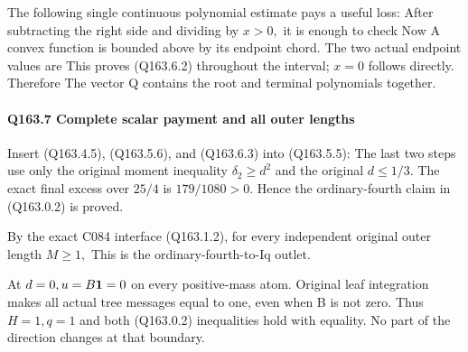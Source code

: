 The following single continuous polynomial estimate pays a useful loss:
After subtracting the right side and dividing by \(x>0,\allowbreak \) it is enough to
check
Now
A convex function is bounded above by its endpoint chord. The two actual
endpoint values are
This proves (Q163.6.2) throughout the interval; \(x=0\) follows directly.
Therefore
The vector Q contains the root and terminal polynomials together.

\paragraph{Q163.7 Complete scalar payment and all outer lengths}\label{part:Q163.7}

Insert (Q163.4.5), (Q163.5.6), and (Q163.6.3) into (Q163.5.5):
The last two steps use only the original moment inequality \(\delta_2\ge d^2\)
and the original \(d\le 1/3.\) The exact final excess over \(25/4\) is
\(179/1080>0.\) Hence the ordinary-fourth claim in (Q163.0.2) is proved.

By the exact C084 interface (Q163.1.2), for every independent original
outer length \(M\ge 1,\allowbreak \)
This is the ordinary-fourth-to-Iq outlet.

At \(d=0,\allowbreak  u=B\mathbf1=0\) on every positive-mass atom. Original leaf integration
makes all actual tree messages equal to one, even when B is not zero.
Thus \(H=1,\allowbreak  q=1\) and both (Q163.0.2) inequalities hold with equality.
No part of the direction changes at that boundary.
